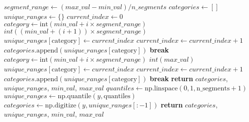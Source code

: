 \documentclass[a4paper, 12pt]{report}
\begin{document}
\begin{algorithm}
\begin{algorithmic}[1]
            \State $segment\_range \gets (max\_val - min\_val) / n\_segments$
            \State $categories \gets []$
            \State $unique\_ranges \gets \{\}$
            \State $current\_index \gets 0$
                            \State $category \gets \text{{int}}(min\_val + i \times segment\_range)$
                            \State $int((min\_val + (i + 1)) \times segment\_range)$
                                \State $unique\_ranges[\text{category}] \gets current\_index$
                                \State $current\_index \gets current\_index + 1$
                            \EndIf
                            \State $categories.\text{append}(unique\_ranges[\text{category}])$
                            \State \textbf{break}
                        \EndIf
                    \Else
                            \State $category \gets \text{{int}}(min\_val + i \times segment\_range)$
                            \State $int(max\_val)$
                                \State $unique\_ranges[\text{category}] \gets current\_index$
                                \State $current\_index \gets current\_index + 1$
                            \EndIf
                            \State $categories.\text{append}(unique\_ranges[\text{category}])$
                            \State \textbf{break}
                        \EndIf
                    \EndIf
                \EndFor
            \EndFor
            \State \textbf{return} $categories$, $unique\_ranges$, $min\_val$, $max\_val$
        \Else
            \State $quantiles \gets \text{np.linspace}(0, 1, \text{n\_segments} + 1)$
                \State $unique\_ranges \gets \text{np.quantile}(y, \text{quantiles})$
            \EndIf
            \State $categories \gets \text{np.digitize}(y, unique\_ranges[:-1])$
            \State \textbf{return} $categories$, $unique\_ranges$, $min\_val$, $max\_val$
        \EndIf
    \EndFunction
    \end{algorithmic}
    \end{algorithm}
\end{document}
